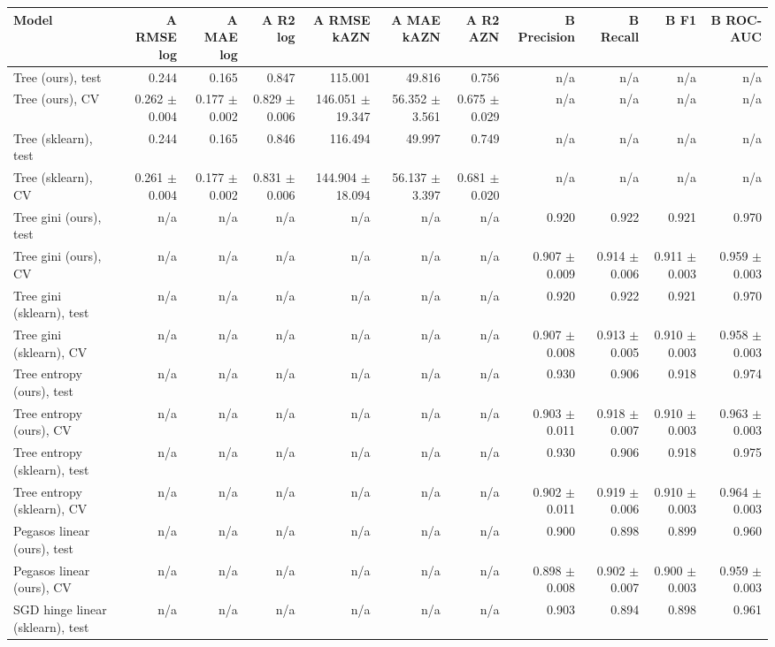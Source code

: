 \begin{tabular}{lrrrrrrrrrr}
\toprule
Model & A RMSE log & A MAE log & A R2 log & A RMSE kAZN & A MAE kAZN & A R2 AZN & B Precision & B Recall & B F1 & B ROC-AUC \\
\midrule
Tree (ours), test & 0.244 & 0.165 & 0.847 & 115.001 & 49.816 & 0.756 & n/a & n/a & n/a & n/a \\
Tree (ours), CV & 0.262 $\pm$ 0.004 & 0.177 $\pm$ 0.002 & 0.829 $\pm$ 0.006 & 146.051 $\pm$ 19.347 & 56.352 $\pm$ 3.561 & 0.675 $\pm$ 0.029 & n/a & n/a & n/a & n/a \\
Tree (sklearn), test & 0.244 & 0.165 & 0.846 & 116.494 & 49.997 & 0.749 & n/a & n/a & n/a & n/a \\
Tree (sklearn), CV & 0.261 $\pm$ 0.004 & 0.177 $\pm$ 0.002 & 0.831 $\pm$ 0.006 & 144.904 $\pm$ 18.094 & 56.137 $\pm$ 3.397 & 0.681 $\pm$ 0.020 & n/a & n/a & n/a & n/a \\
Tree gini (ours), test & n/a & n/a & n/a & n/a & n/a & n/a & 0.920 & 0.922 & 0.921 & 0.970 \\
Tree gini (ours), CV & n/a & n/a & n/a & n/a & n/a & n/a & 0.907 $\pm$ 0.009 & 0.914 $\pm$ 0.006 & 0.911 $\pm$ 0.003 & 0.959 $\pm$ 0.003 \\
Tree gini (sklearn), test & n/a & n/a & n/a & n/a & n/a & n/a & 0.920 & 0.922 & 0.921 & 0.970 \\
Tree gini (sklearn), CV & n/a & n/a & n/a & n/a & n/a & n/a & 0.907 $\pm$ 0.008 & 0.913 $\pm$ 0.005 & 0.910 $\pm$ 0.003 & 0.958 $\pm$ 0.003 \\
Tree entropy (ours), test & n/a & n/a & n/a & n/a & n/a & n/a & 0.930 & 0.906 & 0.918 & 0.974 \\
Tree entropy (ours), CV & n/a & n/a & n/a & n/a & n/a & n/a & 0.903 $\pm$ 0.011 & 0.918 $\pm$ 0.007 & 0.910 $\pm$ 0.003 & 0.963 $\pm$ 0.003 \\
Tree entropy (sklearn), test & n/a & n/a & n/a & n/a & n/a & n/a & 0.930 & 0.906 & 0.918 & 0.975 \\
Tree entropy (sklearn), CV & n/a & n/a & n/a & n/a & n/a & n/a & 0.902 $\pm$ 0.011 & 0.919 $\pm$ 0.006 & 0.910 $\pm$ 0.003 & 0.964 $\pm$ 0.003 \\
Pegasos linear (ours), test & n/a & n/a & n/a & n/a & n/a & n/a & 0.900 & 0.898 & 0.899 & 0.960 \\
Pegasos linear (ours), CV & n/a & n/a & n/a & n/a & n/a & n/a & 0.898 $\pm$ 0.008 & 0.902 $\pm$ 0.007 & 0.900 $\pm$ 0.003 & 0.959 $\pm$ 0.003 \\
SGD hinge linear (sklearn), test & n/a & n/a & n/a & n/a & n/a & n/a & 0.903 & 0.894 & 0.898 & 0.961 \\

\end{tabular}
